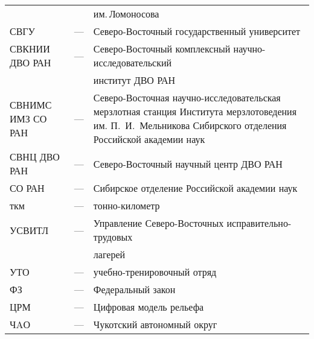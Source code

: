 \begin{changemargin}{-1.5cm}{-1cm}
\begin{tabular}{l c l}
  & & им.\,Ломоносова \\
  СВГУ & --- & Северо-Восточный государственный университет \\
  СВКНИИ ДВО РАН & --- & Северо-Восточный комплексный научно-исследовательский \\ & &
  институт ДВО РАН\\
  СВНИМС ИМЗ СО РАН & --- & Северо-Восточная научно-исследовательская мерзлотная станция Института мерзлотоведения им. П.~И.~Мельникова Сибирского отделения Российской академии наук \\
  СВНЦ ДВО РАН & --- & Северо-Восточный научный центр ДВО РАН \\
  СО РАН & --- & Сибирское отделение Российской академии наук \medskip\\
  ткм & --- & тонно-километр \medskip \\
  УСВИТЛ & --- & Управление Северо-Восточных исправительно-трудовых\\ & & лагерей \\
  УТО & --- & учебно-тренировочный отряд \medskip \\
  ФЗ & --- & Федеральный закон \medskip \\
  ЦРМ& --- & Цифровая модель рельефа \medskip  \\
  ЧAО & --- & Чукотский автономный округ

\end{tabular}
\end{changemargin}
\thispagestyle{empty}
